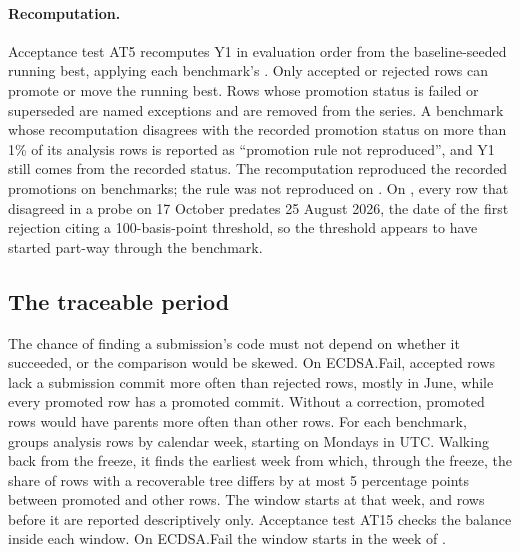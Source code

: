 \paragraph{Recomputation.}
Acceptance test AT5 recomputes Y1 in evaluation order from the baseline-seeded running best, applying each benchmark's .
Only accepted or rejected rows can promote or move the running best.
Rows whose promotion status is failed or superseded are named exceptions and are removed from the series.
A benchmark whose recomputation disagrees with the recorded promotion status on more than 1\% of its analysis rows is reported as ``promotion rule not reproduced'', and Y1 still comes from the recorded status.
The recomputation reproduced the recorded promotions on \ATFiveReproduced{} benchmarks; the rule was not reproduced on \ATFiveNotReproducedList{}.
On , every row that disagreed in a probe on 17 October predates 25 August 2026, the date of the first rejection citing a 100-basis-point threshold, so the threshold appears to have started part-way through the benchmark.

\subsection{The traceable period}
\label{sec:window}

The chance of finding a submission's code must not depend on whether it succeeded, or the comparison would be skewed.
On ECDSA.Fail, accepted rows lack a submission commit more often than rejected rows, mostly in June, while every promoted row has a promoted commit.
Without a correction, promoted rows would have parents more often than other rows.
For each benchmark,  groups analysis rows by calendar week, starting on Mondays in UTC.
Walking back from the freeze, it finds the earliest week from which, through the freeze, the share of rows with a recoverable tree differs by at most 5 percentage points between promoted and other rows.
The window starts at that week, and rows before it are reported descriptively only.
Acceptance test AT15 checks the balance inside each window.
On ECDSA.Fail the window starts in the week of \WindowStartEcdsa{}.
